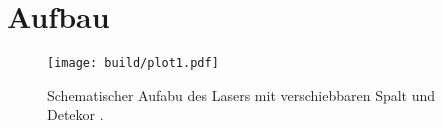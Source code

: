 \section{Aufbau}

\begin{figure}
    \centering
    \texttt{[image: build/plot1.pdf]}
    \caption{Schematischer Aufabu des Lasers mit verschiebbaren Spalt und Detekor \cite{skript}.} 
    \label{fig:abb1}
\end{figure}